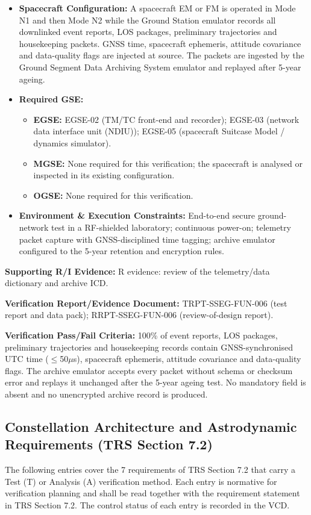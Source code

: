 \begin{itemize}
\item \textbf{Spacecraft Configuration:} A spacecraft EM or FM is operated in Mode N1 and then Mode N2 while the Ground Station emulator records all downlinked event reports, LOS packages, preliminary trajectories and housekeeping packets. GNSS time, spacecraft ephemeris, attitude covariance and data-quality flags are injected at source. The packets are ingested by the Ground Segment Data Archiving System emulator and replayed after 5-year ageing.
\item \textbf{Required GSE:}
\begin{itemize}
\item \textbf{EGSE:} EGSE-02 (TM/TC front-end and recorder); EGSE-03 (network data interface unit (NDIU)); EGSE-05 (spacecraft Suitcase Model / dynamics simulator).
\item \textbf{MGSE:} None required for this verification; the spacecraft is analysed or inspected in its existing configuration.
\item \textbf{OGSE:} None required for this verification.
\end{itemize}
\item \textbf{Environment \& Execution Constraints:} End-to-end secure ground-network test in a RF-shielded laboratory; continuous power-on; telemetry packet capture with GNSS-disciplined time tagging; archive emulator configured to the 5-year retention and encryption rules.
\end{itemize}
\par\textbf{Supporting R/I Evidence:} R evidence: review of the telemetry/data dictionary and archive ICD.
\par\textbf{Verification Report/Evidence Document:} TRPT-SSEG-FUN-006 (test report and data pack); RRPT-SSEG-FUN-006 (review-of-design report).
\par\textbf{Verification Pass/Fail Criteria:} 100\% of event reports, LOS packages, preliminary trajectories and housekeeping records contain GNSS-synchronised UTC time ($\le$50$\mu$s), spacecraft ephemeris, attitude covariance and data-quality flags. The archive emulator accepts every packet without schema or checksum error and replays it unchanged after the 5-year ageing test. No mandatory field is absent and no unencrypted archive record is produced.
\par\medskip
\subsection{Constellation Architecture and Astrodynamic Requirements (TRS Section 7.2)}
The following entries cover the 7 requirements of TRS Section 7.2 that carry a Test (T) or Analysis (A) verification method. Each entry is normative for verification planning and shall be read together with the requirement statement in TRS Section 7.2. The control status of each entry is recorded in the VCD.
